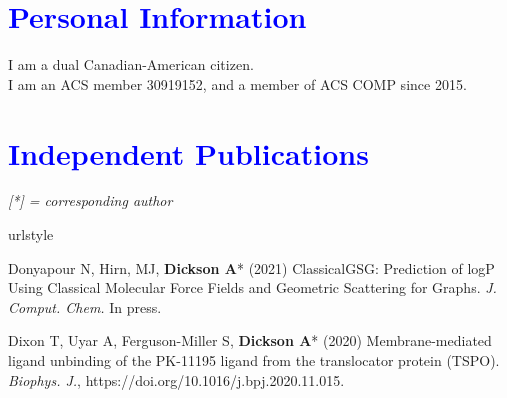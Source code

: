 \documentclass[margin,line]{res}
\begin{document}
\begin{resume}
\section{\sc \textcolor{blue}{ Personal Information}}
I am a dual Canadian-American citizen.\\
I am an ACS member 30919152, and a member of ACS COMP since 2015.

\newpage
\section{\sc \textcolor{blue}{Independent Publications}}


\emph{[*] = corresponding author}
\vspace {0.05in}

\begingroup
\begin{spacing}{1.2}
\renewcommand{\section}[2]{}%
\begin{thebibliography}{10}
\providecommand{\url}[1]{\texttt{#1}}
\providecommand{\urlprefix}{URL }
\expandafter\ifx\csname urlstyle\endcsname\relax
  \providecommand{\doi}[1]{doi:\discretionary{}{}{}#1}\else
  \providecommand{\doi}{doi:\discretionary{}{}{}\begingroup
  \urlstyle{rm}\Url}\fi
\providecommand{\bibAnnoteFile}[1]{%
  \IfFileExists{#1}{\begin{quotation}\noindent\textsc{Key:} #1\\
  \textsc{Annotation:}\ \end{quotation}}{}}
\providecommand{\bibAnnote}[2]{%
  \begin{quotation}\noindent\textsc{Key:} #1\\
  \textsc{Annotation:}\ #2\end{quotation}}
\providecommand{\eprint}[2][]{\url{#2}}

\setlength{\itemsep}{0.15in}
Donyapour N, Hirn, MJ, {\bf Dickson A}* (2021) ClassicalGSG: Prediction of logP Using Classical Molecular Force Fields and Geometric Scattering for Graphs.
\newblock \textit{J. Comput. Chem.} In press.

Dixon T, Uyar A, Ferguson-Miller S, {\bf Dickson A}* (2020) Membrane-mediated ligand unbinding of the PK-11195 ligand from the translocator protein (TSPO).
\newblock \textit{Biophys. J.}, https://doi.org/10.1016/j.bpj.2020.11.015.


\end{thebibliography}
\end{spacing}
\end{resume}
\end{document}
